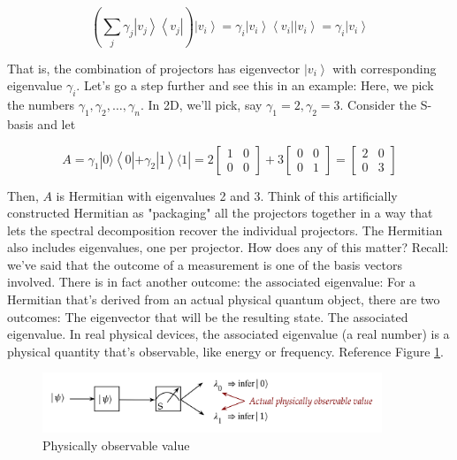\documentclass[main.tex]{subfiles}
\begin{document}
    $$
    \left(\sum_{j} \gamma_{j}\left|v_{j}\right\rangle\left\langle v_{j}\right|\right)\left|v_{i}\right\rangle=\gamma_{i}\left|v_{i}\right\rangle\left\langle v_{i}|| v_{i}\right\rangle=\gamma_{i}\left|v_{i}\right\rangle
    $$
    
    That is, the combination of projectors has eigenvector $\left|v_{i}\right\rangle$ with corresponding eigenvalue $\gamma_{i}$. Let's go a step further and see this in an example: Here, we pick the numbers $\gamma_{1}, \gamma_{2}, \ldots, \gamma_{n}$. In 2D, we'll pick, say $\gamma_{1}=2, \gamma_{2}=3$. Consider the S-basis and let
    
    $$
    A=\gamma_{1}|0\rangle\left\langle 0\left|+\gamma_{2}\right| 1\right\rangle\langle 1|=2\left[\begin{array}{ll}
    1 & 0 \\
    0 & 0
    \end{array}\right]+3\left[\begin{array}{ll}
    0 & 0 \\
    0 & 1
    \end{array}\right]=\left[\begin{array}{ll}
    2 & 0 \\
    0 & 3
    \end{array}\right]
    $$
    
    Then, $A$ is Hermitian with eigenvalues 2 and $3 .$ Think of this artificially constructed Hermitian as "packaging" all the projectors together in a way that lets the spectral decomposition recover the individual projectors. The Hermitian also includes eigenvalues, one per projector. How does any of this matter? Recall: we've said that the outcome of a measurement is one of the basis vectors involved. There is in fact another outcome: the associated eigenvalue: For a Hermitian that's derived from an actual physical quantum object, there are two outcomes: The eigenvector that will be the resulting state. The associated eigenvalue. In real physical devices, the associated eigenvalue (a real number) is a physical quantity that's observable, like energy or frequency. Reference Figure \ref{fig:49qubit5d}.
    
    \begin{figure}
        \centering
        \includegraphics[width=4in]{notes/figs/n05/49qubit5d.png}
        \caption{Physically observable value}
        \label{fig:49qubit5d}
    \end{figure} 
    
\end{document}
